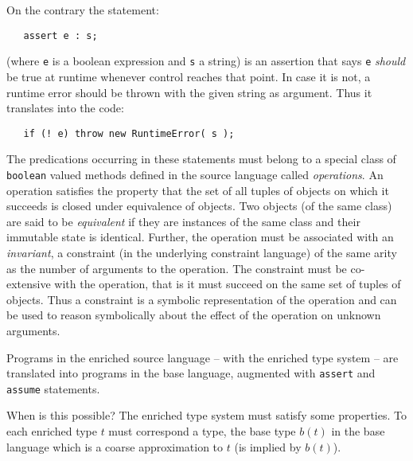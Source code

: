 \documentclass{article}
\begin{document}
On the contrary the statement: 
{\footnotesize
\begin{verbatim}
   assert e : s; 
\end{verbatim}}
(where {\tt e} is a boolean expression and {\tt s} a string) is an
assertion that says {\tt e} {\em should} be true at runtime whenever
control reaches that point. In case it is not, a runtime error should be thrown
with the given string as argument. Thus it translates into the code:
{\footnotesize
\begin{verbatim}
   if (! e) throw new RuntimeError( s );
\end{verbatim}}

The predications occurring in these statements must belong to a
special class of {\tt boolean} valued methods defined in the source
language called {\em operations}. An operation satisfies the property
that the set of all tuples of objects on which it succeeds is closed
under equivalence of objects. Two objects (of the same class) are said
to be {\em equivalent} if they are instances of the same class and
their immutable state is identical. Further, the operation must be
associated with an {\em invariant}, a constraint (in the underlying
constraint language) of the same arity as the number of arguments to
the operation.  The constraint must be co-extensive with the
operation, that is it must succeed on the same set of tuples of
objects.  Thus a constraint is a symbolic representation of the
operation and can be used to reason symbolically about the effect of
the operation on unknown arguments.

Programs in the enriched source language -- with the enriched type
system -- are translated into programs in the base language, augmented
with {\tt assert} and {\tt assume} statements. 

When is this possible? The enriched type system must satisfy some
properties.  To each enriched type $t$ must correspond a type, the
base type $b(t)$ in the base language which is a coarse approximation
to $t$ (is implied by $b(t)$). 




\end{document}
